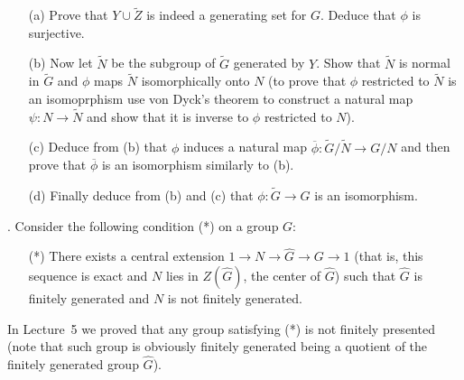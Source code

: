 \documentclass[12pt]{amsart}
\begin{document}
\begin{itemize}
\item[(a)] Prove that $Y\cup \widetilde Z$ is indeed a generating set for $G$. Deduce that $\phi$ is surjective.
\item[(b)] Now let $\widetilde N$ be the subgroup of $\widetilde G$ generated
by $Y$. Show that $\widetilde N$ is normal in $\widetilde G$ and 
$\phi$ maps $\widetilde N$ isomorphically onto $N$ (to prove that
$\phi$ restricted to $\widetilde N$ is an isomoprphism use von Dyck's theorem
to construct a natural map $\psi: N\to \widetilde N$ and show that it is inverse to $\phi$ restricted to $N$).
\item[(c)] Deduce from (b) that $\phi$ induces a natural map
$\overline \phi: \widetilde G/ \widetilde N \to G/N$ and then prove that
$\overline \phi$ is an isomorphism similarly to (b).
\item[(d)] Finally deduce from (b) and (c) that $\phi:\widetilde G\to G$
is an isomorphism.
\end{itemize}
. Consider the following condition (*) on a group $G$:
\begin{itemize}
\item[(*)] There exists a central extension $1\to N\to \widehat G\to G\to 1$ (that is, this sequence is exact and 
$N$ lies in $Z(\widehat G)$, the center of $\widehat G$) such that $\widehat G$ is finitely generated and $N$ is not finitely generated.
\end{itemize}
In Lecture~5 we proved that any group satisfying (*) is not finitely presented (note that such group is obviously finitely generated being a quotient
of the finitely generated group $\widehat G$).
\end{document}

